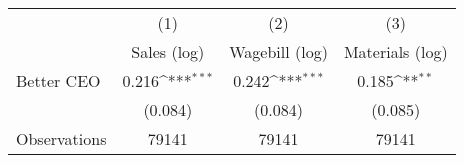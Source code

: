 {
\def\sym#1{\ifmmode^{#1}\else\(^{#1}\)\fi}
\begin{tabular}{l*{3}{c}}
\hline\hline
                    &\multicolumn{1}{c}{(1)}&\multicolumn{1}{c}{(2)}&\multicolumn{1}{c}{(3)}\\
                    &\multicolumn{1}{c}{Sales (log)}&\multicolumn{1}{c}{Wagebill (log)}&\multicolumn{1}{c}{Materials (log)}\\
\hline
Better CEO          &       0.216\sym{***}&       0.242\sym{***}&       0.185\sym{**} \\
                    &     (0.084)         &     (0.084)         &     (0.085)         \\
\hline
Observations        &       79141         &       79141         &       79141         \\
\hline\hline
\end{tabular}
}
